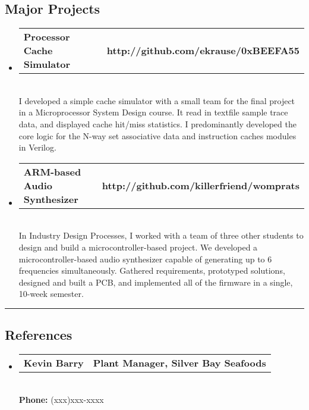 \documentclass[10pt,letterpaper]{article}
\makeatletter
\newcommand{\headerrow}[2]
{\begin{tabular*}{\linewidth}{l@{\extracolsep{\fill}}r}
	#1 &
	#2 \\
\end{tabular*}}
\makeatother
\begin{document}
\subsection*{Major Projects}
\begin{itemize}
  \item 
  \headerrow 
  {\textbf{Processor Cache Simulator}}
  {\textbf{http://github.com/ekrause/0xBEEFA55}}
  \\
  I developed a simple cache simulator with a small team for the final project in a Microprocessor System Design course. It read in textfile sample trace data, and displayed cache hit/miss statistics. I predominantly developed the core logic for the N-way set associative data and instruction caches modules in Verilog.
  \item 
  \headerrow 
  {\textbf{ARM-based Audio Synthesizer}}
  {\textbf{http://github.com/killerfriend/womprats}}
  \\
  In Industry Design Processes, I worked with a team of three other students to design and build a microcontroller-based project. We developed a microcontroller-based audio synthesizer capable of generating up to 6 frequencies simultaneously. Gathered requirements, prototyped solutions, designed and built a PCB, and implemented all of the firmware in a single, 10-week semester. 
  
\end{itemize}
\vspace{1em}

\hrule
\vspace{-0.4em}
\subsection*{References}
\begin{itemize}
  \item
  \headerrow
    {\textbf{Kevin Barry}}
    {\textbf{Plant Manager, Silver Bay Seafoods}}
  \\
  \textbf{Phone: } (xxx)xxx-xxxx

\end{itemize}
\end{document}
